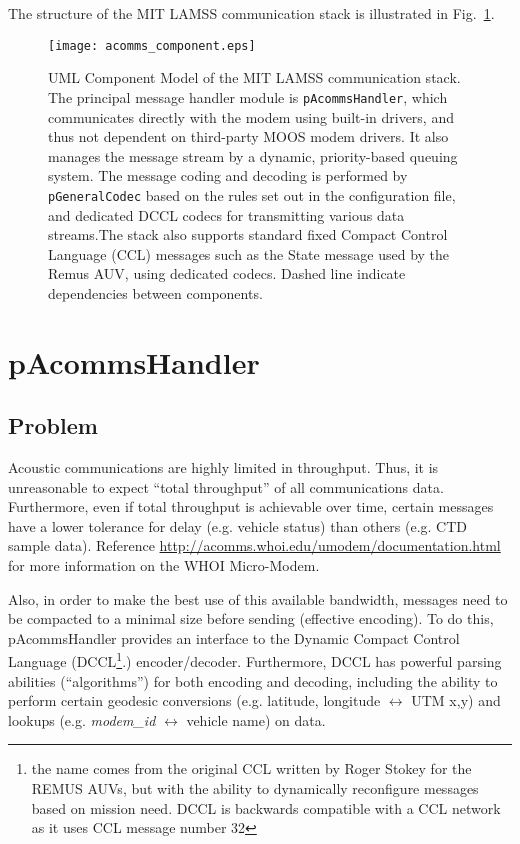 The structure of the MIT LAMSS communication stack
is illustrated in Fig.~\ref{lamss_comms}.

\begin{figure}[tp]
  \centering 
  \texttt{[image: acomms\_component.eps]}
  \caption{UML Component Model of the MIT LAMSS communication stack. The principal
  message handler module is \texttt{pAcommsHandler}, which communicates
  directly with the modem using built-in drivers, and thus not
  dependent on third-party MOOS modem drivers. It also manages the
  message stream by a dynamic, priority-based queuing system. The
  message coding and decoding is performed by \texttt{pGeneralCodec} based on
  the rules set out in the configuration file, and dedicated DCCL
  codecs for transmitting various data streams.The stack also
  supports standard fixed Compact Control Language (CCL) messages such
  as the State message used by the Remus AUV, using dedicated codecs. Dashed line indicate dependencies between components. \label{lamss_comms}}
\end{figure}

\section{pAcommsHandler}
\label{sec:pacommshandler} 


\subsection{Problem}
Acoustic communications are highly limited in throughput. Thus, it is unreasonable to expect ``total throughput'' of all communications data. Furthermore, even if total throughput is achievable over time, certain messages have a lower tolerance for delay (e.g. vehicle status) than others (e.g. CTD sample data). Reference \url{http://acomms.whoi.edu/umodem/documentation.html} for more information on the WHOI Micro-Modem.

Also, in order to make the best use of this available bandwidth, messages need to be compacted to a minimal size before sending (effective encoding). To do this, pAcommsHandler provides an interface to the Dynamic Compact Control Language (DCCL\footnote{the name comes from the original CCL written by Roger Stokey for the REMUS AUVs, but with the ability to dynamically reconfigure messages based on mission need. DCCL is backwards compatible with a CCL network as it uses CCL message number 32}.) encoder/decoder. Furthermore, DCCL has powerful parsing abilities (``algorithms'') for both encoding and decoding, including the ability to perform certain geodesic conversions (e.g. latitude, longitude $\leftrightarrow$ UTM x,y) and lookups (e.g. \textit{modem\_id} $\leftrightarrow$ vehicle name) on data.

